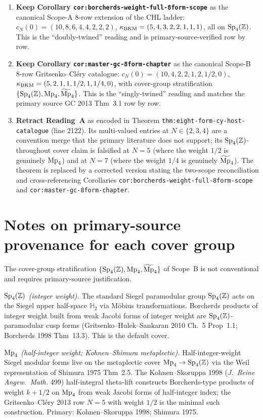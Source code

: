 \begin{enumerate}
\item \textbf{Keep Corollary \texttt{cor:borcherds-weight-full-8form-scope}}
as the canonical Scope-A 8-row extension of the CHL ladder: $c_N(0) =
(10, 8, 6, 4, 4, 2, 2, 2)$, $\kappa_{\mathrm{BKM}} = (5, 4, 3, 2, 2, 1, 1, 1)$, all on
$\mathrm{Sp}_4(\mathbb Z)$. This is the ``doubly-twined'' reading and is
primary-source-verified row by row.
\item \textbf{Keep Corollary \texttt{cor:master-gc-8form-chapter}} as
the canonical Scope-B 8-row Gritsenko--Cl\'ery catalogue: $c_N(0) =
(10, 4, 2, 2, 1, 2, 1/2, 0)$, $\kappa_{\mathrm{BKM}} = (5, 2, 1, 1, 1/2, 1, 1/4, 0)$,
with cover-group stratification $\{\mathrm{Sp}_4(\mathbb Z), \mathrm{Mp}_4,
\widetilde{\mathrm{Mp}}_4\}$. This is the ``singly-twined'' reading and matches the
primary source GC 2013 Thm~3.1 row by row.
\item \textbf{Retract Reading~A} as encoded in Theorem
\texttt{thm:eight-form-cy-host-catalogue} (line 2122). Its
multi-valued entries at $N \in \{2, 3, 4\}$ are a convention merge
that the primary literature does not support; its $\mathrm{Sp}_4(\mathbb Z)$-throughout
cover claim is falsified at $N = 5$ (where the weight $1/2$ is
genuinely $\mathrm{Mp}_4$) and at $N = 7$ (where the weight $1/4$ is
genuinely $\widetilde{\mathrm{Mp}}_4$). The theorem is replaced by a corrected
version stating the two-scope reconciliation and cross-referencing
Corollaries \texttt{cor:borcherds-weight-full-8form-scope} and
\texttt{cor:master-gc-8form-chapter}.
\end{enumerate}

\section*{Notes on primary-source provenance for each cover group}

The cover-group stratification $\{\mathrm{Sp}_4(\mathbb Z), \mathrm{Mp}_4, \widetilde{\mathrm{Mp}}_4\}$ of
Scope~B is not conventional and requires primary-source justification.

\emph{$\mathrm{Sp}_4(\mathbb Z)$ (integer weight).} The standard Siegel paramodular
group $\mathrm{Sp}_4(\mathbb Z)$ acts on the Siegel upper half-space $\mathbb H_2$ via
M\"obius transformations. Borcherds products of integer weight built
from weak Jacobi forms of integer weight are $\mathrm{Sp}_4(\mathbb Z)$-paramodular
cusp forms (Gritsenko--Hulek--Sankaran 2010 Ch.~5 Prop~1.1; Borcherds
1998 Thm~13.3). This is the default cover.

\emph{$\mathrm{Mp}_4$ (half-integer weight; Kohnen--Shimura metaplectic).}
Half-integer-weight Siegel modular forms live on the metaplectic
cover $\mathrm{Mp}_4 \to \mathrm{Sp}_4(\mathbb Z)$ via the Weil representation of Shimura
1975 Thm~2.5. The Kohnen--Skoruppa 1998 (\emph{J.~Reine Angew.~Math.}
499) half-integral theta-lift constructs Borcherds-type products of
weight $k + 1/2$ on $\mathrm{Mp}_4$ from weak Jacobi forms of half-integer
index; the Gritsenko--Cl\'ery 2013 row $N = 5$ with weight $1/2$ is
the minimal such construction. Primary: Kohnen--Skoruppa 1998;
Shimura 1975.

